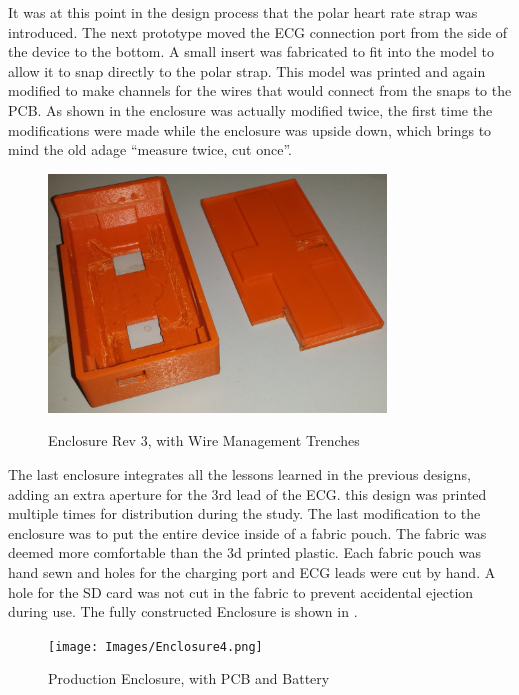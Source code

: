 It was at this point in the design process that the polar heart rate strap was introduced. The next prototype moved the ECG connection port from the side of the device to the bottom. A small insert was fabricated to fit into the model to allow it to snap directly to the polar strap. This model was printed and again modified to make channels for the wires that would connect from the snaps to the PCB. As shown in  the enclosure was actually modified twice, the first time the modifications were made while the enclosure was upside down, which brings to mind the old adage ``measure twice, cut once''. 

\begin{figure}[ht]
 \begin{center}
  \label{fig:enclosure3}
  \includegraphics[scale=1,width=0.8\textwidth]{Images/Enclosure3.png} 
  \caption{Enclosure Rev 3, with Wire Management Trenches} 
 \end{center}
\end{figure}


The last enclosure integrates all the lessons learned in the previous designs, adding an extra aperture for the 3rd lead of the ECG. this design was printed multiple times for distribution during the study. The last modification to the enclosure was to put the entire device inside of a fabric pouch. The fabric was deemed more comfortable than the 3d printed plastic. Each fabric pouch was hand sewn and holes for the charging port and ECG leads were cut by hand. A hole for the SD card was not cut in the fabric to prevent accidental ejection during use. The fully constructed Enclosure is shown in .

\begin{figure}[ht]
 \begin{center}
  \label{fig:enclosure4}
  \texttt{[image: Images/Enclosure4.png]} 
  \caption{Production Enclosure, with PCB and Battery} 
 \end{center}
\end{figure}

